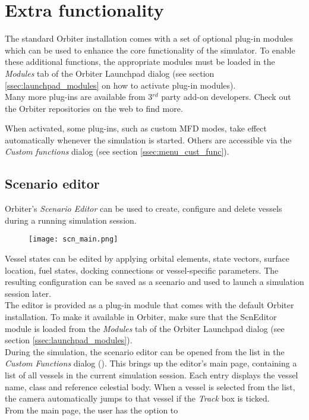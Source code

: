 \documentclass[Orbiter User Manual.tex]{subfiles}
\begin{document}
\section{Extra functionality}
\label{sec:extra}
The standard Orbiter installation comes with a set of optional plug-in modules which can be used to enhance the core functionality of the simulator. To enable these additional functions, the appropriate modules must be loaded in the \textit{Modules} tab of the Orbiter Launchpad dialog (see section \ref{ssec:launchpad_modules} on how to activate plug-in modules).\\
Many more plug-ins are available from 3$^{rd}$ party add-on developers. Check out the Orbiter repositories on the web to find more.\\


\noindent
When activated, some plug-ins, such as custom MFD modes, take effect automatically whenever the simulation is started. Others are accessible via the \textit{Custom functions} dialog (see section \ref{ssec:menu_cust_func}).


\subsection{Scenario editor}
\label{ssec:scn_editor}
Orbiter's \textit{Scenario Editor} can be used to create, configure and delete vessels during a running simulation session.

\begin{figure}[H]
	\centering
	\texttt{[image: scn\_main.png]}
\end{figure}

\noindent
Vessel states can be edited by applying orbital elements, state vectors, surface location, fuel states, docking connections or vessel-specific parameters. The resulting configuration can be saved as a scenario and used to launch a simulation session later.\\
The editor is provided as a plug-in module that comes with the default Orbiter installation. To make it available in Orbiter, make sure that the ScnEditor module is loaded from the \textit{Modules} tab of the Orbiter Launchpad dialog (see section \ref{ssec:launchpad_modules}).\\
During the simulation, the scenario editor can be opened from the list in the \textit{Custom Functions} dialog (\Ctrl{}). This brings up the editor's main page, containing a list of all vessels in the current simulation session. Each entry displays the vessel name, class and reference celestial body. When a vessel is selected from the list, the camera automatically jumps to that vessel if the \textit{Track} box is ticked.\\
From the main page, the user has the option to
\end{document}
